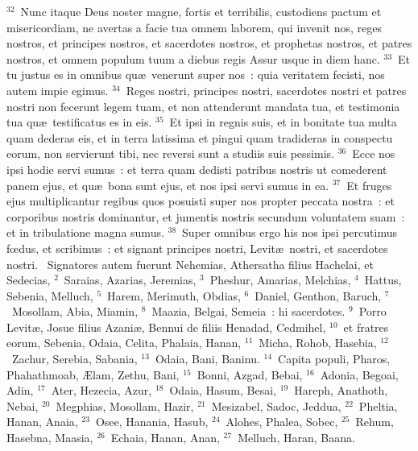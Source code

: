 ${}^{32}$~Nunc itaque Deus noster magne, fortis et terribilis, custodiens pactum et misericordiam, ne avertas a facie tua omnem laborem, qui invenit nos, reges nostros, et principes nostros, et sacerdotes nostros, et prophetas nostros, et patres nostros, et omnem populum tuum a diebus regis Assur usque in diem hanc.
${}^{33}$~Et tu justus es in omnibus qu\ae\ venerunt super nos~: quia veritatem fecisti, nos autem impie egimus.
${}^{34}$~Reges nostri, principes nostri, sacerdotes nostri et patres nostri non fecerunt legem tuam, et non attenderunt mandata tua, et testimonia tua qu\ae\ testificatus es in eis.
${}^{35}$~Et ipsi in regnis suis, et in bonitate tua multa quam dederas eis, et in terra latissima et pingui quam tradideras in conspectu eorum, non servierunt tibi, nec reversi sunt a studiis suis pessimis.
${}^{36}$~Ecce nos ipsi hodie servi sumus~: et terra quam dedisti patribus nostris ut comederent panem ejus, et qu\ae\ bona sunt ejus, et nos ipsi servi sumus in ea.
${}^{37}$~Et fruges ejus multiplicantur regibus quos posuisti super nos propter peccata nostra~: et corporibus nostris dominantur, et jumentis nostris secundum voluntatem suam~: et in tribulatione magna sumus.
${}^{38}$~Super omnibus ergo his nos ipsi percutimus fœdus, et scribimus~: et signant principes nostri, Levit\ae\ nostri, et sacerdotes nostri.
~Signatores autem fuerunt Nehemias, Athersatha filius Hachelai, et Sedecias,
${}^{2}$~Saraias, Azarias, Jeremias,
${}^{3}$~Pheshur, Amarias, Melchias,
${}^{4}$~Hattus, Sebenia, Melluch,
${}^{5}$~Harem, Merimuth, Obdias,
${}^{6}$~Daniel, Genthon, Baruch,
${}^{7}$~Mosollam, Abia, Miamin,
${}^{8}$~Maazia, Belgai, Semeia~: hi sacerdotes.
${}^{9}$~Porro Levit\ae , Josue filius Azani\ae , Bennui de filiis Henadad, Cedmihel,
${}^{10}$~et fratres eorum, Sebenia, Odaia, Celita, Phalaia, Hanan,
${}^{11}$~Micha, Rohob, Hasebia,
${}^{12}$~Zachur, Serebia, Sabania,
${}^{13}$~Odaia, Bani, Baninu.
${}^{14}$~Capita populi, Pharos, Phahathmoab, \AE lam, Zethu, Bani,
${}^{15}$~Bonni, Azgad, Bebai,
${}^{16}$~Adonia, Begoai, Adin,
${}^{17}$~Ater, Hezecia, Azur,
${}^{18}$~Odaia, Hasum, Besai,
${}^{19}$~Hareph, Anathoth, Nebai,
${}^{20}$~Megphias, Mosollam, Hazir,
${}^{21}$~Mesizabel, Sadoc, Jeddua,
${}^{22}$~Pheltia, Hanan, Anaia,
${}^{23}$~Osee, Hanania, Hasub,
${}^{24}$~Alohes, Phalea, Sobec,
${}^{25}$~Rehum, Hasebna, Maasia,
${}^{26}$~Echaia, Hanan, Anan,
${}^{27}$~Melluch, Haran, Baana.


